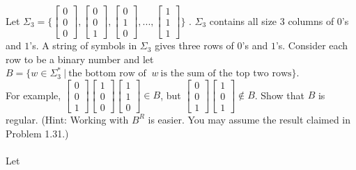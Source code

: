 \begin{enumerate}
          Let $\Sigma_3 = \Biggl \{\begin{bmatrix}0 \\ 0 \\ 0\end{bmatrix} , \begin{bmatrix}0 \\0 \\1 \end{bmatrix}, \begin{bmatrix}0 \\1 \\0\end{bmatrix} ,..., \begin{bmatrix}1 \\1 \\1\end{bmatrix} \Biggl \}$ . $\Sigma_3$ contains all size 3 columns of $0$'s and $1$'s. A string of symbols in $\Sigma_3$ gives three rows of $0$'s and $1$'s. Consider each row to be a binary number and let \\
          $B =\{w \in \Sigma^\ast_3 ~|~ \text{the bottom row of }~w~\text{is the sum of the top two rows}\}$. \\
          For example, $ \begin{bmatrix}0 \\0 \\1\end{bmatrix}  \begin{bmatrix}1 \\0 \\0\end{bmatrix} \begin{bmatrix} 1\\ 1\\ 0\end{bmatrix} \in B $, but $\begin{bmatrix}0 \\0 \\1\end{bmatrix} \begin{bmatrix}1\\ 0\\1\end{bmatrix} \notin B$. Show that $B$ is regular. (Hint: Working with $B^R$ is easier. You may assume the result claimed in Problem 1.31.)
          \\
          \\
          Let


\end{enumerate}
